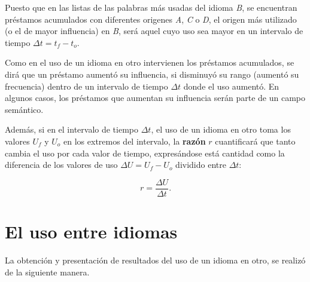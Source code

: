 Puesto que en las listas de las palabras más usadas del idioma \textit{B}, se encuentran préstamos acumulados con diferentes origenes \textit{A}, \textit{C} o \textit{D}, el origen más utilizado (o el de mayor influencia) en \textit{B}, será aquel cuyo uso sea mayor en un intervalo de tiempo $\Delta t = t_{f} - t_{o}$.

Como en el uso de un idioma en otro intervienen los préstamos acumulados, se dirá que un préstamo aumentó su influencia, si disminuyó su rango (aumentó su frecuencia) dentro de un intervalo de tiempo $\Delta t$ donde el uso aumentó.  En algunos casos, los préstamos  que aumentan su influencia serán parte de un campo semántico.



Además, si en el intervalo de tiempo $\Delta t$, el uso de un idioma en otro toma los valores $U_{f}$ y $U_{o}$ en los extremos del intervalo, la \textbf{razón} $r$  cuantificará que tanto cambia el uso por cada valor de tiempo, expresándose está cantidad como la diferencia de los valores de uso $\Delta U = U_{f}-U_{o}$ dividido entre $\Delta t$:

\begin{equation}
r = \frac{\Delta U}{\Delta t}.
\label{ec.razon}
\end{equation}	




\section {El uso entre idiomas} 

La obtención y presentación de resultados del uso de un idioma en otro, se realizó de la siguiente manera.


